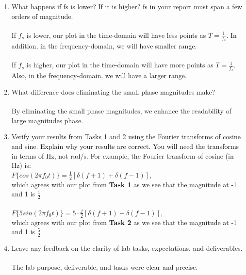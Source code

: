\documentclass[12pt,a4paper]{article}
\begin{document}
\begin{enumerate}
    \item
    What happens if fs is lower? If it is higher? fs in your report must span a few orders of magnitude.\\
    
    \\If $f_s$ is lower, our plot in the time-domain will have less points as $T = \frac{1}{f_s}$. In addition, in the frequency-domain, we will have smaller range.\\
    
    \\If $f_s$ is higher, our plot in the time-domain will have more points as $T = \frac{1}{f_s}$. Also, in the frequency-domain, we will have a larger range.\\
    
    \item
    What difference does eliminating the small phase magnitudes make?\\
    
    \\By eliminating the small phase magnitudes, we enhance the readability of large magnitudes phase.\\
    
    \item
    Verify your results from Tasks 1 and 2 using the Fourier transforms of cosine and sine. Explain why your results are correct. You will need the transforms in terms of Hz, not rad/s. For example, the Fourier transform of cosine (in Hz) is:\\

    $F\{cos(2\pi f_0 t)\} = \frac{1}{2}[\delta(f+1) + \delta(f-1)]$,\\
    
    which agrees with our plot from \textbf{Task 1} as we see that the magnitude at -1 and 1 is $\frac{1}{2}$\\
    
    \\$F\{5sin(2\pi f_0 t)\} = 5\cdot \frac{j}{2}[\delta(f+1)-\delta(f-1)],$\\
    
    which agrees with our plot from \textbf{Task 2} as we see that the magnitude at -1 and 1 is $\frac{5}{2}$\\
    
    
    \item
    Leave any feedback on the clarity of lab tasks, expectations, and deliverables.\\
    \\The lab purpose, deliverable, and tasks were clear and precise.
    
\end{enumerate}
\end{document}
